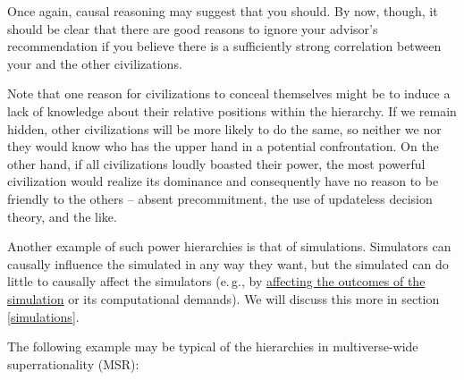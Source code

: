 Once again, causal reasoning may suggest that you should. By now,
though, it should be clear that there are good reasons to ignore your
advisor's recommendation if you believe there is a sufficiently strong
correlation between your and the other civilizations.

Note that one reason for civilizations to conceal themselves might be to
induce a lack of knowledge about their relative positions within the
hierarchy. If we remain hidden, other civilizations will be more likely
to do the same, so neither we nor they would know who has the upper hand
in a potential confrontation. On the other hand, if all civilizations
loudly boasted their power, the most powerful civilization would realize
its dominance and consequently have no reason to be friendly to the
others -- absent precommitment, the use of updateless decision theory,
and the like.

Another example of such power hierarchies is that of simulations.
Simulators can causally influence the simulated in any way they want,
but the simulated can do little to causally affect the simulators (e.\,g.,
by
\href{https://foundational-research.org/how-the-simulation-argument-dampens-future-fanaticism\#Our_simulated_copies_can_still_impact_the_far_future_by_helping_our_simulators}{affecting
the outcomes of the simulation} or its computational demands). We will
discuss this more in section
\ref{simulations}.

The following example may be typical of the hierarchies in
multiverse-wide superrationality (MSR):

